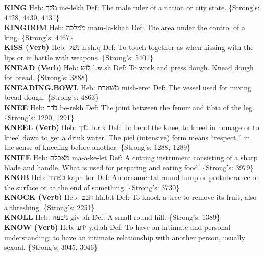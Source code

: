 {\textbf{KING} Heb: {\large\H מלך} me-lekh Def: The male ruler of a nation or city state. \{Strong's: 4428, 4430, 4431\}\hfill{}\\

\textbf{KINGDOM} Heb: {\large\H ממלכה} mam-la-khah Def: The area under the control of a king. \{Strong's: 4467\}\hfill{}\\

\textbf{KISS (Verb)} Heb: {\large\H נשק} n.sh.q Def: To touch together as when kissing with the lips or in battle with weapons. \{Strong's: 5401\}\hfill{}\\

\textbf{KNEAD (Verb)} Heb: {\large\H לוש} l.w.sh Def: To work and press dough. Knead dough for bread. \{Strong's: 3888\}\hfill{}\\

\textbf{KNEADING.BOWL} Heb: {\large\H משארת} mish-eret Def: The vessel used for mixing bread dough. \{Strong's: 4863\}\hfill{}\\

\textbf{KNEE} Heb: {\large\H ברך} be-rekh Def: The joint between the femur and tibia of the leg. \{Strong's: 1290, 1291\}\hfill{}\\

\textbf{KNEEL (Verb)} Heb: {\large\H ברך} b.r.k Def: To bend the knee, to kneel in homage or to kneel down to get a drink water. The piel (intensive) form means ``respect,'' in the sense of kneeling before another. \{Strong's: 1288, 1289\}\hfill{}\\

\textbf{KNIFE} Heb: {\large\H מאכלת} ma-a-ke-let Def: A cutting instrument consisting of a sharp blade and handle. What is used for preparing and eating food. \{Strong's: 3979\}\hfill{}\\

\textbf{KNOB} Heb: {\large\H כפתור} kaph-tor Def: An ornamental round lump or protuberance on the surface or at the end of something. \{Strong's: 3730\}\hfill{}\\

\textbf{KNOCK (Verb)} Heb: {\large\H חבט} hh.b.t Def: To knock a tree to remove its fruit, also a threshing. \{Strong's: 2251\}\hfill{}\\

\textbf{KNOLL} Heb: {\large\H גיבעה} giv-ah Def: A small round hill. \{Strong's: 1389\}\hfill{}\\

\textbf{KNOW (Verb)} Heb: {\large\H ידע} y.d.ah Def: To have an intimate and personal understanding; to have an intimate relationship with another person, usually sexual. \{Strong's: 3045, 3046\}\hfill{}\\

}
